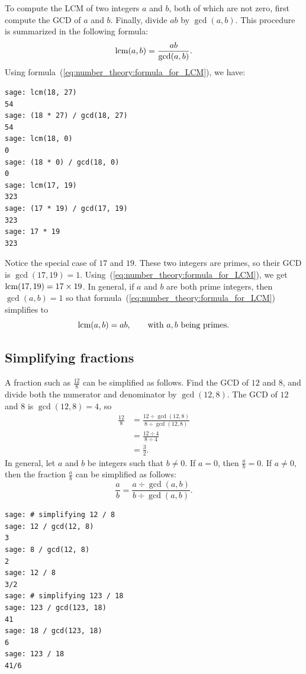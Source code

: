 To compute the LCM of two integers $a$ and $b$, both of which are not
zero, first compute the GCD of $a$ and $b$. Finally, divide $ab$ by
$\gcd(a,b)$. This procedure is summarized in the following formula:
%
\begin{equation}
\label{eq:number_theory:formula_for_LCM}
\operatorname*{\text{lcm}}(a, b)
=
\frac{ab}{\gcd(a, b)}.
\end{equation}
%
Using formula~(\ref{eq:number_theory:formula_for_LCM}), we have:
%
\begin{lstlisting}
sage: lcm(18, 27)
54
sage: (18 * 27) / gcd(18, 27)
54
sage: lcm(18, 0)
0
sage: (18 * 0) / gcd(18, 0)
0
sage: lcm(17, 19)
323
sage: (17 * 19) / gcd(17, 19)
323
sage: 17 * 19
323
\end{lstlisting}

Notice the special case of $17$ and $19$. These two integers are
primes, so their GCD is $\gcd(17, 19) = 1$.
Using~(\ref{eq:number_theory:formula_for_LCM}), we get
$\operatorname*{\text{lcm}}(17, 19) = 17 \times 19$. In general, if $a$ and $b$ are both
prime integers, then $\gcd(a, b) = 1$ so that
formula~(\ref{eq:number_theory:formula_for_LCM}) simplifies to
\[
\operatorname*{\text{lcm}}(a, b)
=
ab,
\qquad
\text{with $a,b$ being primes}.
\]



\subsection{Simplifying fractions}

A fraction such as $\frac{12}{8}$ can be simplified as follows. Find
the GCD of $12$ and $8$, and divide both the numerator and denominator
by $\gcd(12, 8)$. The GCD of $12$ and $8$ is $\gcd(12, 8) = 4$, so
%
\begin{align*}
\frac{12}{8}
&=
\frac{12 \div \gcd(12, 8)} {8 \div \gcd(12, 8)} \\[4pt]
&=
\frac{12 \div 4} {8 \div 4} \\[4pt]
&=
\frac{3}{2}.
\end{align*}
%
In general, let $a$ and $b$ be integers such that $b \neq 0$. If
$a = 0$, then $\frac{a}{b} = 0$. If $a \neq 0$, then the fraction
$\frac{a}{b}$ can be simplified as follows:
\[
\frac{a}{b}
=
\frac{a \div \gcd(a, b)} {b \div \gcd(a, b)}.
\]

\begin{lstlisting}
sage: # simplifying 12 / 8
sage: 12 / gcd(12, 8)
3
sage: 8 / gcd(12, 8)
2
sage: 12 / 8
3/2
sage: # simplifying 123 / 18
sage: 123 / gcd(123, 18)
41
sage: 18 / gcd(123, 18)
6
sage: 123 / 18
41/6
\end{lstlisting}

